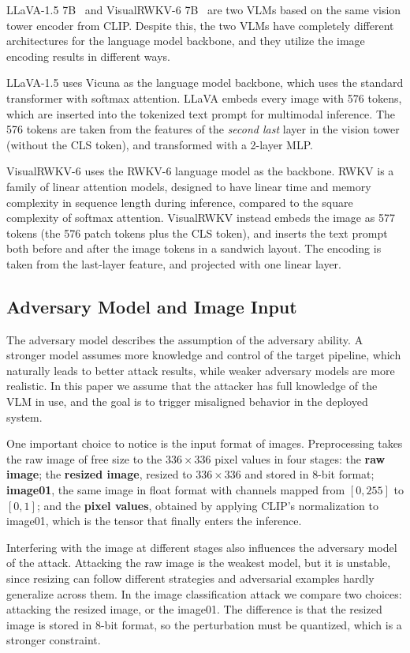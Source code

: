 \documentclass[conference]{IEEEtran}
\begin{document}
LLaVA-1.5 7B~\cite{Liu2024LLaVA15} and VisualRWKV-6
7B~\cite{Hou2025VisualRWKV} are two VLMs based on the same vision tower
encoder from CLIP. Despite this, the two VLMs have completely different
architectures for the language model backbone, and they utilize the image
encoding results in different ways.

LLaVA-1.5 uses Vicuna as the language model backbone, which uses the
standard transformer with softmax attention. LLaVA embeds every image with
576 tokens, which are inserted into the tokenized text prompt for
multimodal inference. The 576 tokens are taken from the features of the
\textit{second last} layer in the vision tower (without the CLS token), and
transformed with a 2-layer MLP.

VisualRWKV-6 uses the RWKV-6 language model as the backbone. RWKV is a family of linear attention models, designed to have
linear time and memory complexity in sequence length during inference,
compared to the square complexity of softmax attention. VisualRWKV instead embeds the
image as 577 tokens (the 576 patch tokens plus the CLS token), and inserts
the text prompt both before and after the image tokens in a sandwich
layout. The encoding is taken from the last-layer feature, and projected
with one linear layer.

\subsection{Adversary Model and Image Input}

The adversary model describes the assumption of the adversary ability. A
stronger model assumes more knowledge and control of the target pipeline,
which naturally leads to better attack results, while weaker adversary
models are more realistic. In this paper we assume that the attacker has
full knowledge of the VLM in use, and the goal is to trigger misaligned
behavior in the deployed system.

One important choice to notice is the input format of images.
Preprocessing takes the raw image of free size to the $336\times336$ pixel
values in four stages: the \textbf{raw image}; the \textbf{resized image},
resized to $336\times336$ and stored in 8-bit format; \textbf{image01}, the
same image in float format with channels mapped from $[0,255]$ to $[0,1]$;
and the \textbf{pixel values}, obtained by applying CLIP's normalization to
image01, which is the tensor that finally enters the inference.

Interfering with the image at different stages also influences the
adversary model of the attack. Attacking the raw image is the weakest
model, but it is unstable, since resizing can follow different strategies
and adversarial examples hardly generalize across them. In the image
classification attack we compare two choices: attacking the resized image,
or the image01. The difference is that the resized image is stored in 8-bit
format, so the perturbation must be quantized, which is a stronger
constraint.
\end{document}
